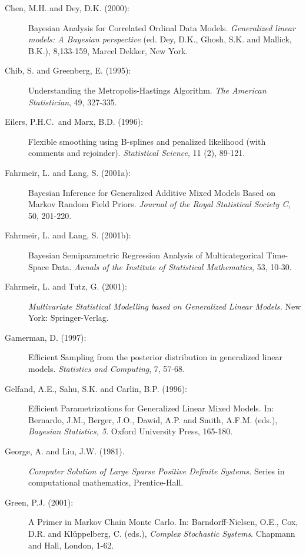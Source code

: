 \begin{description}
\item[Chen, M.H. and Dey, D.K. (2000):] Bayesian Analysis for Correlated Ordinal Data Models.
{\em Generalized linear models: A Bayesian perspective} (ed. Dey,
D.K., Ghosh, S.K. and Mallick, B.K.), 8,133-159, Marcel Dekker,
New York.

\item[Chib, S. and Greenberg, E. (1995):] Understanding the
Metropolis-Hastings Algorithm. {\em The American Statistician},
49, 327-335.

\item [Eilers, P.H.C.~and Marx, B.D. (1996):]
Flexible smoothing using B-splines and penalized likelihood (with
comments and rejoinder). {\it Statistical Science}, 11 (2),
89-121.

\item[Fahrmeir, L. and Lang, S. (2001a):]
Bayesian Inference for Generalized Additive Mixed Models Based on
Markov Random Field Priors. {\em Journal of the Royal Statistical
Society C}, 50, 201-220.

\item[Fahrmeir, L. and Lang, S. (2001b):] Bayesian Semiparametric Regression Analysis of Multicategorical
Time-Space Data. {\em Annals of the Institute of Statistical
Mathematics}, 53, 10-30.

\item[Fahrmeir, L. and Tutz, G. (2001):] {\em Multivariate Statistical
Modelling based on Generalized Linear Models.} New York:
Springer-Verlag.


\item[Gamerman, D. (1997):] Efficient Sampling from the posterior distribution
in generalized linear models. {\em Statistics and Computing}, 7,
57-68.

\item[Gelfand, A.E., Sahu, S.K. and Carlin, B.P. (1996):] Efficient Parametrizations for
Generalized Linear Mixed Models. In: Bernardo, J.M., Berger, J.O.,
Dawid, A.P. and Smith, A.F.M. (eds.), {\em Bayesian Statistics,
5}. Oxford University Press, 165-180.

\item[George, A. and Liu, J.W. (1981).] {\em Computer Solution of Large
Sparse Positive Definite Systems.} Series in computational
mathematics, Prentice-Hall.

\item[Green, P.J. (2001):] A Primer in Markov Chain Monte Carlo. In: Barndorff-Nielsen, O.E.,
Cox, D.R. and Kl{\"u}ppelberg, C. (eds.), {\em Complex Stochastic
Systems}. Chapmann and Hall, London, 1-62.


\end{description}
